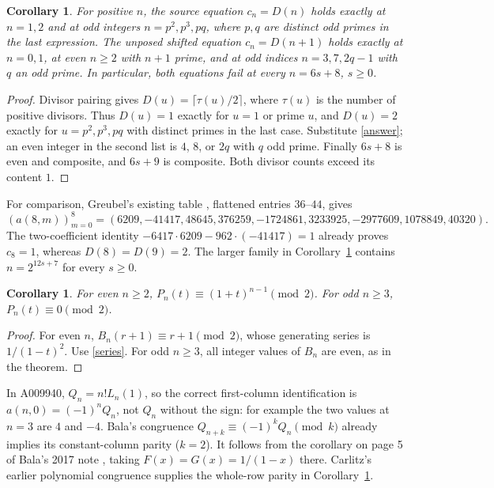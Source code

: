 \documentclass[11pt]{article}
\newtheorem{corollary}[theorem]{Corollary}
\begin{document}
\begin{corollary}\label{equalities}
For positive $n$, the source equation $c_n=D(n)$ holds exactly at
$n=1,2$ and at odd integers $n=p^2,p^3,pq$, where $p,q$ are distinct
odd primes in the last expression.
The unposed shifted equation $c_n=D(n+1)$ holds exactly at $n=0,1$,
at even $n\geq2$ with $n+1$ prime, and at odd indices
$n=3,7,2q-1$ with $q$ an odd prime.
In particular, both equations fail at every $n=6s+8$, $s\geq0$.
\end{corollary}
\begin{proof}
Divisor pairing gives $D(u)=\lceil\tau(u)/2\rceil$, where $\tau(u)$ is
the number of positive divisors. Thus $D(u)=1$ exactly for $u=1$ or
prime $u$, and $D(u)=2$ exactly for $u=p^2,p^3,pq$ with distinct primes
in the last case. Substitute \eqref{answer}; an even integer in the
second list is $4$, $8$, or $2q$ with $q$ odd prime.
Finally $6s+8$ is even and composite, and $6s+9$ is composite.
Both divisor counts exceed its content $1$.
\end{proof}

For comparison, Greubel's existing table \cite{greubel}, flattened entries
$36$--$44$, gives
\begin{equation}\label{row8}
 (a(8,m))_{m=0}^8=(6209,-41417,48645,376259,-1724861,
 3233925,-2977609,1078849,40320).
\end{equation}
The two-coefficient identity
$-6417\cdot6209-962\cdot(-41417)=1$ already proves $c_8=1$,
whereas $D(8)=D(9)=2$. The larger family in Corollary~\ref{equalities}
contains $n=2^{12s+7}$ for every $s\geq0$.

\begin{corollary}\label{parity}
For even $n\geq2$, $P_n(t)\equiv(1+t)^{n-1}\pmod2$.
For odd $n\geq3$, $P_n(t)\equiv0\pmod2$.
\end{corollary}
\begin{proof}
For even $n$, $B_n(r+1)\equiv r+1\pmod2$, whose generating series is
$1/(1-t)^2$. Use \eqref{series}. For odd $n\geq3$, all integer
values of $B_n$ are even, as in the theorem.
\end{proof}
In A009940, $Q_n=n!L_n(1)$, so the correct first-column identification
is $a(n,0)=(-1)^n Q_n$, not $Q_n$ without the sign: for example the
two values at $n=3$ are $4$ and $-4$.
Bala's congruence $Q_{n+k}\equiv(-1)^k Q_n\pmod k$ \cite{constantcolumn}
already implies its constant-column parity ($k=2$).
It follows from the corollary on page 5 of Bala's 2017 note \cite{bala},
taking $F(x)=G(x)=1/(1-x)$ there. Carlitz's earlier polynomial
congruence supplies the whole-row parity in Corollary~\ref{parity}.
\end{document}
